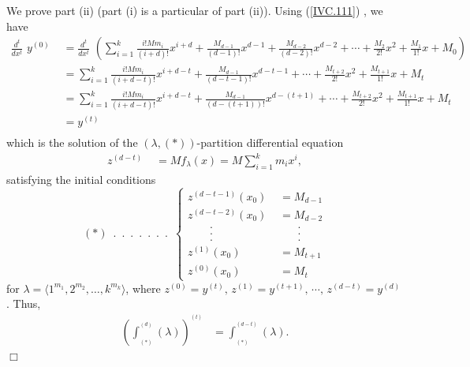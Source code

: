 \documentclass[11pt]{amsart}
\theoremstyle{remark}
\renewenvironment{proof}{{\noindent\bf Proof.}}{\hfill $\Box$\par\vskip3mm}
\theoremstyle{definition}
\theoremstyle{remark}
\numberwithin{equation}{section}
\begin{document}
\begin{proof}
We prove part (ii) (part (i) is a particular of part (ii)). 	Using (\ref{IVC.111}) , we have 
\begin{equation} \label{IVC.112}
	\begin{aligned}
		\frac{d^t}{dx^t} \,\, y^{(0)} & \,\, = 	\frac{d^t}{dx^t} \,\,( \sum_{i=1}^{k} \frac{i! M m_i}{(i+d)!} x^{i+d} + \frac{M_{d-1} }{(d-1)!} x^{d-1}  +  \frac{M_{d-2} }{(d-2)!} x^{d-2} + \cdots +  \frac{M_{2}}{2!} x^2  +   \frac{M_{1}}{1!} x + M_0)\\
		& \,\, =  \sum_{i=1}^{k} \frac{i! M m_i}{(i+d-t)!} x^{i+d-t} + \frac{M_{d-1} }{(d-t-1)!} x^{d-t-1}  +  %
		\cdots +  \frac{M_{t+2}}{2!} x^2  +   \frac{M_{t+1}}{1!} x + M_t\\
		& \,\, =  \sum_{i=1}^{k} \frac{i! M m_i}{(i+d-t)!} x^{i+d-t} + \frac{M_{d-1} }{(d-(t+1))!} x^{d-(t+1)} +  %
		\cdots +  \frac{M_{t+2}}{2!} x^2  +   \frac{M_{t+1}}{1!} x + M_t\\
		& \,\, =  y^{(t)}\\
	\end{aligned}	
\end{equation}
which is the solution of the $(\lambda,(*))$-partition differential equation 
\begin{align}
	z^{(d-t)} 	& \,\, =  M f_\lambda(x)= M \sum_{i=1}^{k}  m_i x^{i},
\end{align}	
satisfying the initial conditions
\begin{equation*}
	(*)   \,\,\, . \,\,\, . \,\,\, . \,\,\, . \,\,\, . \,\,\, . \,\,\, . \,\,\,
	\begin{cases}
		z^{(d-t-1)}(x_0)	& \,\, = M_{d-1} \\
		z^{(d-t-2)}(x_0)	& \,\, =  M_{d-2}\\
		\quad \quad .	& \quad \quad . \\
		\quad \quad .	& \quad \quad . \\
		\quad \quad .	& \quad \quad . \\
		z^{(1)}(x_0)	& \,\, =  M_{t+1}\\
		z^{(0)}(x_0)	& \,\, = M_t 
	\end{cases}       
\end{equation*}
for $\lambda=\langle1^{m_1},2^{m_2},\dots,k^{m_k}\rangle$, where  $z^{(0)}=y^{(t)}, \, z^{(1)}=y^{(t+1)}, \, \cdots, \, z^{(d-t)}=y^{(d)}$.
Thus,  
\begin{equation}
	\begin{aligned}\label{sequence11114.2}
		\left( \int^{\!^{(d)}}_{\!_{(*)}} (\lambda) \right)^{\!^{(t)}}
		&= \int^{\!^{(d-t)}}_{\!_{(*)}} (\lambda).\\
	\end{aligned}	
\end{equation} 
\end{proof}
\end{document}
